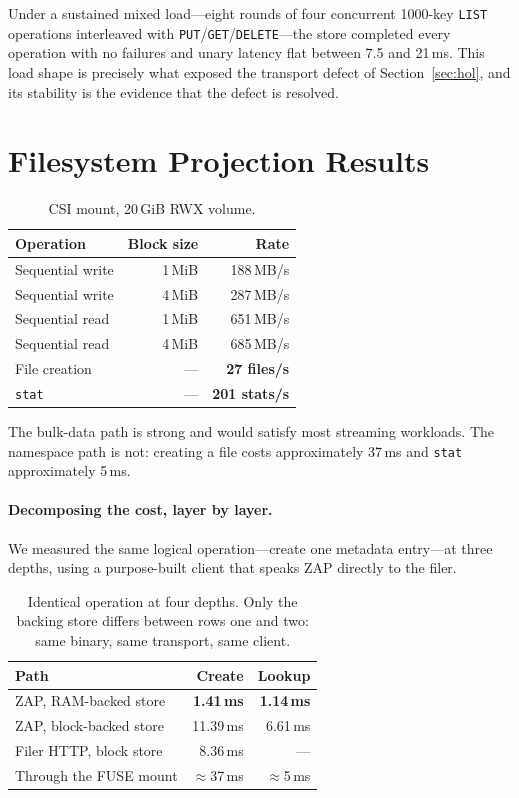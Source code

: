 \documentclass[11pt]{article}
\begin{document}
Under a sustained mixed load---eight rounds of four concurrent
1000-key \texttt{LIST} operations interleaved with
\texttt{PUT}/\texttt{GET}/\texttt{DELETE}---the store completed every
operation with no failures and unary latency flat between 7.5 and
21\,ms. This load shape is precisely what exposed the transport defect
of Section~\ref{sec:hol}, and its stability is the evidence that the defect
is resolved.

\section{Filesystem Projection Results}

\begin{table}[h]
\centering
\begin{tabular}{lrr}
\toprule
Operation & Block size & Rate \\
\midrule
Sequential write & 1\,MiB & 188\,MB/s \\
Sequential write & 4\,MiB & 287\,MB/s \\
Sequential read  & 1\,MiB & 651\,MB/s \\
Sequential read  & 4\,MiB & 685\,MB/s \\
\midrule
File creation & --- & \textbf{27 files/s} \\
\texttt{stat} & --- & \textbf{201 stats/s} \\
\bottomrule
\end{tabular}
\caption{CSI mount, 20\,GiB RWX volume.}
\end{table}

The bulk-data path is strong and would satisfy most streaming workloads. The
namespace path is not: creating a file costs approximately 37\,ms and
\texttt{stat} approximately 5\,ms.

\paragraph{Decomposing the cost, layer by layer.} We measured the same
logical operation---create one metadata entry---at three depths, using a
purpose-built client that speaks ZAP directly to the filer.

\begin{table}[h]
\centering
\begin{tabular}{lrr}
\toprule
Path & Create & Lookup \\
\midrule
ZAP, RAM-backed store   & \textbf{1.41\,ms} & \textbf{1.14\,ms} \\
ZAP, block-backed store & 11.39\,ms & 6.61\,ms \\
Filer HTTP, block store &  8.36\,ms & --- \\
Through the FUSE mount  & \(\approx\)37\,ms & \(\approx\)5\,ms \\
\bottomrule
\end{tabular}
\caption{Identical operation at four depths. Only the backing store differs
between rows one and two: same binary, same transport, same client.}
\end{table}
\end{document}
